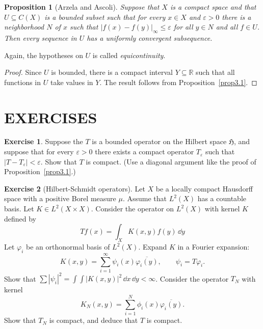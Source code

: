 \documentclass[12pt,reqno]{book}%
\newtheorem{proposition}{Proposition}[chapter]
\theoremstyle{definition}
\newtheorem{exercise}{Exercise}[chapter]
\theoremstyle{remark}
\theoremstyle{theorem}
\theoremstyle{remark}
\renewcommand{\d}{\dd}
\begin{document}
\begin{proposition}[Arzela and Ascoli]\label{proparzelaascoli}%
    Suppose that $X$ is a compact space and that $U \subseteq C(X)$ is a bounded subset such that for every $x \in X$ and $\varepsilon > 0$ there is a neighborhood $N$ of $x$ such that $|f(x) - f(y)|_\infty \leq \varepsilon$ for all $y \in N$ and all $f \in U$.
    Then every sequence in $U$ has a uniformly convergent subsequence.
\end{proposition}%

Again, the hypotheses on $U$ is called \emph{equicontinuity}.

\begin{proof}%
    Since $U$ is bounded, there is a compact interval $Y \subseteq \mathbb{R}$ such that all functions in $U$ take values in $Y$.
    The result follows from Proposition~\ref{prop3.1}.
\end{proof}%

\section*{EXERCISES}%
\begin{exercise}\label{}
    Suppose the $T$ is a bounded operator on the Hilbert space $\mathfrak{H}$, and suppose that for every $\varepsilon > 0$ there exists a compact operator $T_\varepsilon$ such that $|T - T_\varepsilon| < \varepsilon$.
    Show that $T$ is compact.
    (Use a diagonal argument like the proof of Proposition~\ref{prop3.1}.)
\end{exercise}

\begin{exercise}[Hilbert-Schmidt operators]\label{}
    Let $X$ be a locally compact Hausdorff space with a positive Borel measure $\mu$.
    Assume that $L^2(X)$ has a countable basis.
    Let $K \in L^2(X \times X)$.
    Consider the operator on $L^2(X)$ with kernel $K$ defined by
    \[
        T f(x) = \int_{X} K(x, y) f(y) \, \d y
    \]
    Let $\varphi_i$ be an orthonormal basis of $L^2(X)$.
    Expand $K$ in a Fourier expansion:
    \[
        K(x, y) = \sum\limits_{i=1}^{\infty} \psi_i(x) \overline{\varphi_i(y)}, \qquad \psi_i = T\varphi_i.
    \]
    Show that $\sum |\psi_i|^2 = \int \int |K(x, y)|^2 \, \d x \, \d y < \infty$.
    Consider the operator $T_N$ with kernel
    \[
        K_N(x, y) = \sum\limits_{i=1}^{N} \phi_i(x) \overline{\varphi_i(y)}.
    \]
    Show that $T_N$ is compact, and deduce that $T$ is compact.
\end{exercise}
\end{document}
